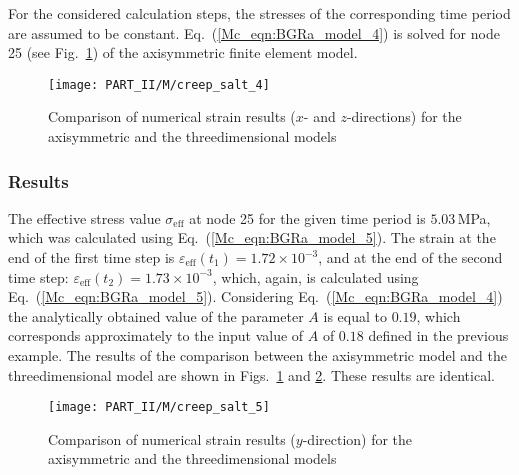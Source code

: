 For the considered calculation steps, the stresses of the corresponding time period are assumed to be constant. Eq.~(\ref{Mc_eqn:BGRa_model_4}) is solved for node 25 (see Fig.~\ref{Mc_fig:creep_salt_4}) of the axisymmetric finite element model.
%
\begin{figure}[htb]
\centering
\texttt{[image: PART\_II/M/creep\_salt\_4]}
\caption{Comparison of numerical strain results ($x$- and $z$-directions) for the axisymmetric and the threedimensional models}
\label{Mc_fig:creep_salt_4}
\end{figure}

\subsubsection{Results}
\label{subsubsec:Mc3_res}

The effective stress value $\sigma_{\mathrm{eff}}$ at node 25 for the given time period is $5.03\,$MPa, which was calculated using Eq.~(\ref{Mc_eqn:BGRa_model_5}). The strain at the end of the first time step is $\varepsilon_{\mathrm{eff}}(t_1)=1.72\times 10^{-3}$, and at the end of the second time step: $\varepsilon_{\mathrm{eff}}(t_2)=1.73\times 10^{-3}$, which, again, is calculated using Eq.~(\ref{Mc_eqn:BGRa_model_5}). Considering Eq.~(\ref{Mc_eqn:BGRa_model_4}) the analytically obtained value of the parameter $A$ is equal to $0.19$, which corresponds approximately to the input value of $A$ of $0.18$ defined in the previous example. The results of the comparison between the axisymmetric model and the threedimensional model are shown in Figs.~\ref{Mc_fig:creep_salt_4} and \ref{Mc_fig:creep_salt_5}. These results are identical.
%
\begin{figure}[htb]
\centering
\texttt{[image: PART\_II/M/creep\_salt\_5]}
\caption{Comparison of numerical strain results ($y$-direction) for the axisymmetric and the threedimensional models}
\label{Mc_fig:creep_salt_5}
\end{figure}

\clearpage